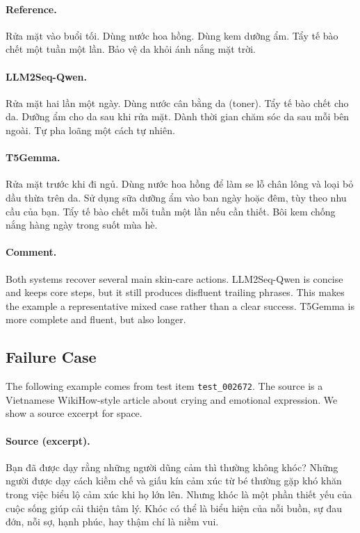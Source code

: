 \documentclass[11pt]{article}
\begin{document}
\paragraph{Reference.}
Rửa mặt vào buổi tối.
Dùng nước hoa hồng.
Dùng kem dưỡng ẩm.
Tẩy tế bào chết một tuần một lần.
Bảo vệ da khỏi ánh nắng mặt trời.

\paragraph{LLM2Seq-Qwen.}
Rửa mặt hai lần một ngày.
Dùng nước cân bằng da (toner).
Tẩy tế bào chết cho da.
Dưỡng ẩm cho da sau khi rửa mặt.
Dành thời gian chăm sóc da sau mỗi bên ngoài.
Tự pha loãng một cách tự nhiên.

\paragraph{T5Gemma.}
Rửa mặt trước khi đi ngủ.
Dùng nước hoa hồng để làm se lỗ chân lông và loại bỏ dầu thừa trên da.
Sử dụng sữa dưỡng ẩm vào ban ngày hoặc đêm, tùy theo nhu cầu của bạn.
Tẩy tế bào chết mỗi tuần một lần nếu cần thiết.
Bôi kem chống nắng hàng ngày trong suốt mùa hè.

\paragraph{Comment.}
Both systems recover several main skin-care actions.
LLM2Seq-Qwen is concise and keeps core steps, but it still produces disfluent trailing phrases.
This makes the example a representative mixed case rather than a clear success.
T5Gemma is more complete and fluent, but also longer.

\subsection{Failure Case}

The following example comes from test item \texttt{test\_002672}.
The source is a Vietnamese WikiHow-style article about crying and emotional expression.
We show a source excerpt for space.

\paragraph{Source (excerpt).}
Bạn đã được dạy rằng những người dũng cảm thì thường không khóc?
Những người được dạy cách kiềm chế và giấu kín cảm xúc từ bé thường gặp khó khăn trong việc biểu lộ cảm xúc khi họ lớn lên.
Nhưng khóc là một phần thiết yếu của cuộc sống giúp cải thiện tâm lý.
Khóc có thể là biểu hiện của nỗi buồn, sự đau đớn, nỗi sợ, hạnh phúc, hay thậm chí là niềm vui.
\end{document}
